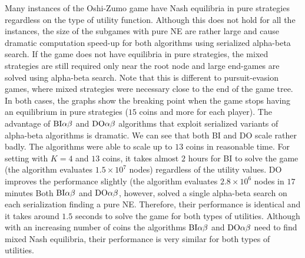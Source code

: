 Many instances of the Oshi-Zumo game have Nash equilibria in pure strategies regardless on the type of utility function.
Although this does not hold for all the instances, the size of the subgames with pure NE are rather large and cause dramatic computation speed-up for both algorithms using serialized alpha-beta search.
If the game does not have equilibria in pure strategies, the mixed strategies are still required only near the root node and large end-games are solved using alpha-beta search.
Note that this is different to pursuit-evasion games, where mixed strategies were necessary close to the end of the game tree.
In both cases, the graphs show the breaking point when the game stops having an equilibrium in pure strategies ($15$ coins and more for each player).
The advantage of $\textrm{BI}\alpha\beta$ and $\textrm{DO}\alpha\beta$ algorithms that exploit serialized variants of alpha-beta algorithms is dramatic.
We can see that both \textsc{BI} and \textsc{DO} scale rather badly.
The algorithms were able to scale up to $13$ coins in reasonable time.
For setting with $K=4$ and $13$ coins, it takes almost $2$ hours for \textsc{BI} to solve the game (the algorithm evaluates $1.5\times10^7$ nodes) regardless of the utility values.
\textsc{DO} improves the performance slightly (the algorithm evaluates $2.8\times10^6$ nodes in $17$ minutes 
Both $\textrm{BI}\alpha\beta$ and $\textrm{DO}\alpha\beta$, however, solved a single alpha-beta search on each serialization finding a pure NE.
Therefore, their performance is identical and it takes around $1.5$ seconds to solve the game for both types of utilities.
Although with an increasing number of coins the algorithms $\textrm{BI}\alpha\beta$ and $\textrm{DO}\alpha\beta$ need to find mixed Nash equilibria, their performance is very similar for both types of utilities.

